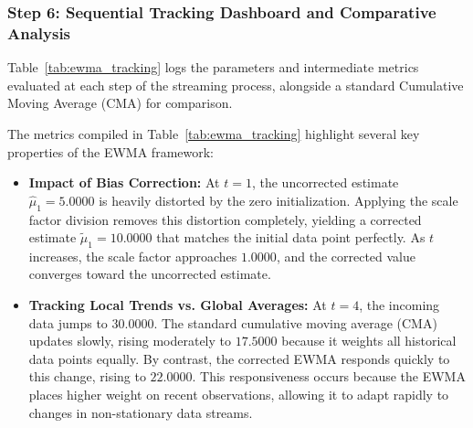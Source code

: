 \documentclass{article}
\begin{document}
\subsubsection{Step 6: Sequential Tracking Dashboard and Comparative Analysis}
Table~\ref{tab:ewma_tracking} logs the parameters and intermediate metrics evaluated at each step of the streaming process, alongside a standard Cumulative Moving Average ($\text{CMA}$) for comparison.

\begin{table}[htbp]
\centering
\small
{}
\caption{Sequential Metric Adjustments and Bias Correction Profiles for Streaming EWMA ($\beta = 0.5$)}
\label{tab:ewma_tracking}
\end{table}

The metrics compiled in Table~\ref{tab:ewma_tracking} highlight several key properties of the EWMA framework:
\begin{itemize}
    \item \textbf{Impact of Bias Correction:} At $t = 1$, the uncorrected estimate $\hat{\mu}_1 = 5.0000$ is heavily distorted by the zero initialization. Applying the scale factor division removes this distortion completely, yielding a corrected estimate $\tilde{\mu}_1 = 10.0000$ that matches the initial data point perfectly. As $t$ increases, the scale factor approaches $1.0000$, and the corrected value converges toward the uncorrected estimate.
    \item \textbf{Tracking Local Trends vs. Global Averages:} At $t = 4$, the incoming data jumps to $30.0000$. The standard cumulative moving average ($\text{CMA}$) updates slowly, rising moderately to $17.5000$ because it weights all historical data points equally. By contrast, the corrected EWMA responds quickly to this change, rising to $22.0000$. This responsiveness occurs because the EWMA places higher weight on recent observations, allowing it to adapt rapidly to changes in non-stationary data streams.
\end{itemize}
\end{document}
